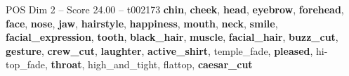\begin{textsample}{POS Dim 2 – Score 24.00 – t002173}  \label{ex:f2_pos_010}
\textbf{chin}, \textbf{cheek}, \textbf{head}, \textbf{eyebrow}, \textbf{forehead}, \textbf{face}, \textbf{nose}, \textbf{jaw}, \textbf{hairstyle}, \textbf{happiness}, \textbf{mouth}, \textbf{neck}, \textbf{smile}, \textbf{facial\_expression}, \textbf{tooth}, \textbf{black\_hair}, \textbf{muscle}, \textbf{facial\_hair}, \textbf{buzz\_cut}, \textbf{gesture}, \textbf{crew\_cut}, \textbf{laughter}, \textbf{active\_shirt}, temple\_fade, \textbf{pleased}, hi-top\_fade, \textbf{throat}, high\_and\_tight, flattop, \textbf{caesar\_cut}

\end{textsample}
